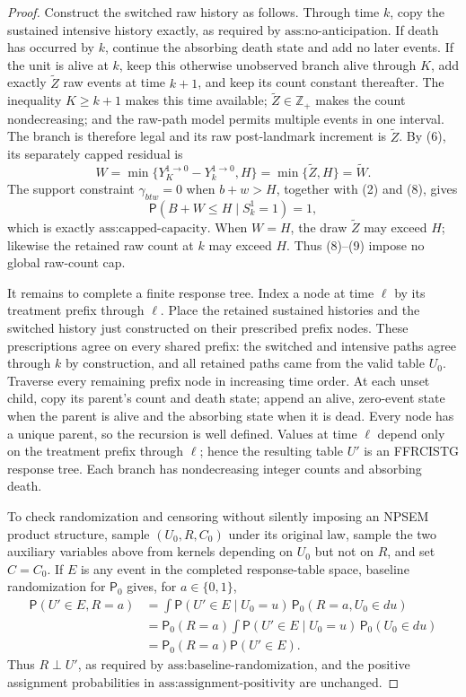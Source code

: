 \documentclass{article}
\begin{document}
\begin{proof}
Construct the switched raw history as follows. Through time \(k\), copy the sustained intensive history exactly, as required by \(\text{ass:no-anticipation}\). If death has occurred by \(k\), continue the absorbing death state and add no later events. If the unit is alive at \(k\), keep this otherwise unobserved branch alive through \(K\), add exactly \(\widetilde Z\) raw events at time \(k+1\), and keep its count constant thereafter. The inequality \(K\ge k+1\) makes this time available; \(\widetilde Z\in\mathbb Z_+\) makes the count nondecreasing; and the raw-path model permits multiple events in one interval. The branch is therefore legal and its raw post-landmark increment is \(\widetilde Z\). By (6), its separately capped residual is
\[
 W=\min\{Y_K^{1\to0}-Y_k^{1\to0},H\}
   =\min\{\widetilde Z,H\}=\widetilde W.                \tag{8}
\]
The support constraint \(\gamma_{btw}=0\) when \(b+w>H\), together with (2) and (8), gives
\[
 \mathsf P(B+W\le H\mid S_k^1=1)=1,                     \tag{9}
\]
which is exactly \(\text{ass:capped-capacity}\). When \(W=H\), the draw \(\widetilde Z\) may exceed \(H\); likewise the retained raw count at \(k\) may exceed \(H\). Thus (8)--(9) impose no global raw-count cap.

It remains to complete a finite response tree. Index a node at time \(\ell\) by its treatment prefix through \(\ell\). Place the retained sustained histories and the switched history just constructed on their prescribed prefix nodes. These prescriptions agree on every shared prefix: the switched and intensive paths agree through \(k\) by construction, and all retained paths came from the valid table \(U_0\). Traverse every remaining prefix node in increasing time order. At each unset child, copy its parent's count and death state; append an alive, zero-event state when the parent is alive and the absorbing state when it is dead. Every node has a unique parent, so the recursion is well defined. Values at time \(\ell\) depend only on the treatment prefix through \(\ell\); hence the resulting table \(U'\) is an FFRCISTG response tree. Each branch has nondecreasing integer counts and absorbing death.

To check randomization and censoring without silently imposing an NPSEM product structure, sample \((U_0,R,C_0)\) under its original law, sample the two auxiliary variables above from kernels depending on \(U_0\) but not on \(R\), and set \(C=C_0\). If \(E\) is any event in the completed response-table space, baseline randomization for \(\mathsf P_0\) gives, for \(a\in\{0,1\}\),
\[
 \begin{aligned}
 \mathsf P(U'\in E,R=a)
 &=\int \mathsf P(U'\in E\mid U_0=u)\,
       \mathsf P_0(R=a,U_0\in du)\\
 &=\mathsf P_0(R=a)\int \mathsf P(U'\in E\mid U_0=u)\,
       \mathsf P_0(U_0\in du)\\
 &=\mathsf P_0(R=a)\mathsf P(U'\in E).
 \end{aligned}                                           \tag{10}
\]
Thus \(R\perp U'\), as required by \(\text{ass:baseline-randomization}\), and the positive assignment probabilities in \(\text{ass:assignment-positivity}\) are unchanged.


\end{proof}
\end{document}
